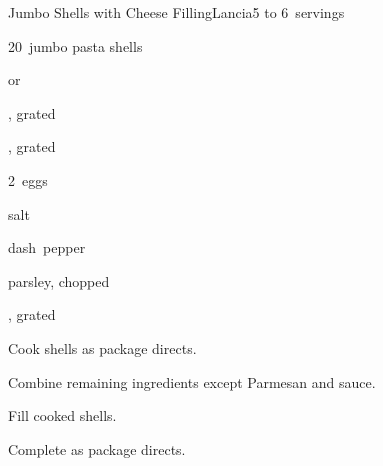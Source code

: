 \begin{recipe}{Jumbo Shells with Cheese Filling\FIXME}{Lancia}{5 to 6~servings}

\begin{ingredients}
\item 20~jumbo pasta shells
\item {}  or 
\item \C{1\half} , grated
\item \C{1\half} , grated
\item 2~eggs
\item \tp{\half} salt
\item dash~pepper
\item {} parsley, chopped
\item \C{3\half} 
\item \C{\quarter} , grated
\end{ingredients}

\begin{directions}
\item Cook shells as package directs.
\item Combine remaining ingredients except Parmesan and sauce.
\item Fill cooked shells.
\item Complete as package directs.
\end{directions}

\end{recipe}
